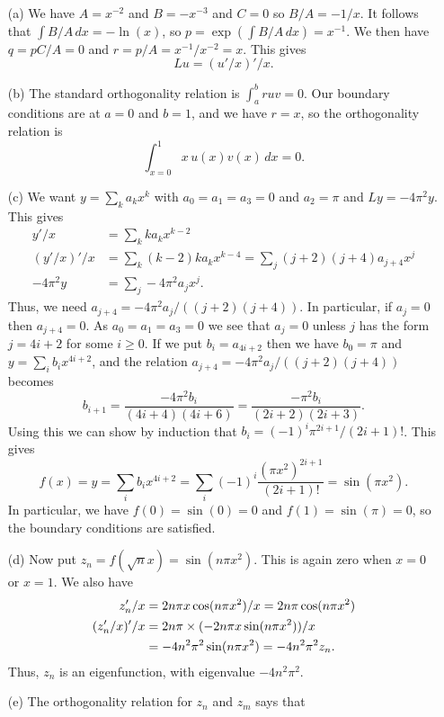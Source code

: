 \documentclass[a4paper]{amsart}
\begin{document}
\begin{solution}
 \begin{itemize}
  \item[(a)] We have $A=x^{-2}$ and $B=-x^{-3}$ and $C=0$
   so $B/A=-1/x$.  It follows that $\int B/A\,dx=-\ln(x)$, so
   $p=\exp\left(\int B/A\,dx\right)=x^{-1}$.  We then have
   $q=pC/A=0$ and $r=p/A=x^{-1}/x^{-2}=x$.  This gives 
   \[ Lu = (u'/x)'/x. \]
  \item[(b)] The standard orthogonality relation is $\int_a^b ruv=0$.
   Our boundary conditions are at $a=0$ and $b=1$, and we have
   $r=x$, so the orthogonality relation is
   \[ \int_{x=0}^1 x\,u(x)v(x)\, dx = 0. \]
  \item[(c)] We want $y=\sum_ka_kx^k$ with $a_0=a_1=a_3=0$ and
   $a_2=\pi$ and $Ly=-4\pi^2y$.  This gives
   \begin{align*}
     y'/x &= \sum_k ka_kx^{k-2} \\
     (y'/x)'/x &= \sum_k (k-2)ka_kx^{k-4}
                 = \sum_j (j+2)(j+4)a_{j+4}x^j \\
     -4\pi^2 y &= \sum_j -4\pi^2a_jx^j. 
   \end{align*}
   Thus, we need $a_{j+4}=-4\pi^2a_j/((j+2)(j+4))$.  In particular, if
   $a_j=0$ then $a_{j+4}=0$.  As $a_0=a_1=a_3=0$ we see that $a_j=0$
   unless $j$ has the form $j=4i+2$ for some $i\geq 0$.  If we put
   $b_i=a_{4i+2}$ then we have $b_0=\pi$ and $y=\sum_ib_ix^{4i+2}$,
   and the relation $a_{j+4}=-4\pi^2a_j/((j+2)(j+4))$ becomes
   \[ b_{i+1} = \frac{-4\pi^2b_i}{(4i+4)(4i+6)} =
       \frac{-\pi^2b_i}{(2i+2)(2i+3)}.
   \]
   Using this we can show by induction that $b_i=(-1)^i\pi^{2i+1}/(2i+1)!$.
   This gives
   \[ f(x) = y
        = \sum_ib_ix^{4i+2}=\sum_i(-1)^i\frac{(\pi x^2)^{2i+1}}{(2i+1)!}
        = \sin(\pi x^2).
   \]
   In particular, we have $f(0)=\sin(0)=0$ and $f(1)=\sin(\pi)=0$, so
   the boundary conditions are satisfied.
  \item[(d)] Now put $z_n=f(\sqrt{n}x)=\sin(n\pi x^2)$.  This is again
   zero when $x=0$ or $x=1$.  We also have
   \begin{align*}
     z'_n/x &= 2n\pi x\cos(n\pi x^2)/x = 2n\pi\cos(n\pi x^2) \\
     (z'_n/x)'/x &= 2n\pi\times (-2n\pi x\sin(n\pi x^2))/x \\
       &= -4n^2\pi^2\sin(n\pi x^2) = -4n^2\pi^2 z_n.
   \end{align*}
   Thus, $z_n$ is an eigenfunction, with eigenvalue $-4n^2\pi^2$.
  \item[(e)] The orthogonality relation for $z_n$ and $z_m$ says that

\end{itemize}
\end{solution}
\end{document}
